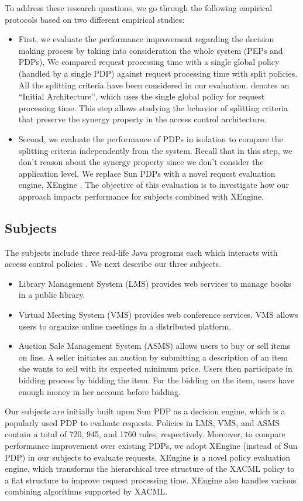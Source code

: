 To address these research questions, we go through the following empirical protocols based on two different empirical studies:
\begin{itemize}
\item First, we evaluate the performance improvement regarding the decision making process by taking into consideration the whole system 
(PEPs and PDPs), We compared request processing time with a single global policy (handled by a single PDP) against request processing time with
split policies. All the splitting criteria have been considered in our evaluation.
 denotes an ``Initial Architecture'', which uses the single global policy for request processing time.
This step allows studying the behavior of splitting criteria that preserve the synergy property in the access control architecture.

\item Second, we evaluate the performance of PDPs in isolation to compare the splitting criteria independently from the system.
Recall that in this step, we don't reason about the synergy property since we don't consider the application level.
We replace Sun PDPs with a novel request evaluation engine, XEngine \cite{Xengine}. 
The objective of this evaluation is to investigate how our approach impacts performance for subjects combined with XEngine.
\end{itemize}

\subsection{Subjects}
The subjects include three real-life Java programs each which interacts with access control policies \cite{testcase}. We next describe
our three subjects.
\begin{itemize}	
\item Library Management System (LMS) provides web services to manage books in a public library.
\item Virtual Meeting System (VMS) provides web conference services. VMS allows users to organize
online meetings in a distributed platform.
\item Auction Sale Management System (ASMS) allows users to buy or sell items on line. A seller 
initiates an auction by submitting a description of an item she wants to sell with its expected minimum 
price. Users then participate in bidding process by
bidding the item. For the bidding on the item, users have enough money in her account before bidding.
\end{itemize}
Our subjects are initially built upon Sun PDP \cite{sunxacml} as a decision engine, which is a popularly used PDP to evaluate
 requests. Policies in LMS, VMS, and ASMS contain a total of 720, 945, and 1760 rules, respectively.
Moreover, to compare performance improvement over existing PDPs, we adopt XEngine (instead of Sun PDP) in our subjects to evaluate requests.
XEngine is a novel policy evaluation engine, which transforms the hierarchical tree structure of the XACML policy to a flat structure
to improve request processing time. XEngine also handles various combining algorithms supported by XACML. 

